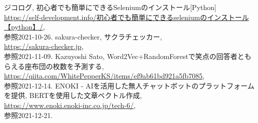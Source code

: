 \documentclass[a4paper,11pt,titlepage]{jsarticle}
\begin{document}
\begin{thebibliography}{9}
ジコログ, 初心者でも簡単にできるSeleniumのインストール[Python]\\
 \url{https://self-development.info/初心者でも簡単にできるseleniumのインストール【python】/}, \\参照2021-10-26.
 sakura-checker, サクラチェッカー,\\
 \url{https://sakura-checker.jp}, \\参照2021-11-09.
  Kazuyoshi Sato, Word2Vec+RandomForestで笑点の回答者ともらえる座布団の枚数を予測する,\\
 \url{https://qiita.com/WhitePepperKS/items/ef9ab61bd921a5fb7085}, \\参照2021-12-14.
ENOKI - AIを活用した無人チャットボットのプラットフォームを提供, BERTを使用した文章ベクトル作成,\\
 \url{https://www.enoki.enoki-inc.co.jp/tech-6/}, \\参照2021-12-21.

\end{thebibliography}
\end{document}
